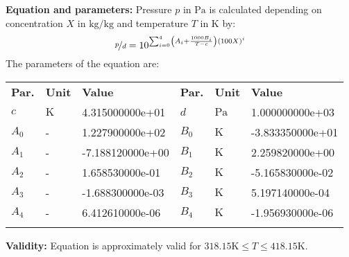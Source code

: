 \textbf{Equation and parameters:}
\newline
%
Pressure $p$ in $\si{\pascal}$ is calculated depending on concentration $X$ in $\si{\kilogram\per\kilogram}$ and  temperature $T$ in $\si{\kelvin}$ by:
%
\begin{equation*}
\nicefrac{p}{d} = 10 ^ { \sum_{i=0}^{4} \left( A_i + \frac{1000 B_i}{T - c} \right) \left( 100 X \right) ^{i}}
\end{equation*}
%
The parameters of the equation are:
%
\begin{longtable}[l]{lll|lll}
\toprule
\addlinespace
\textbf{Par.} & \textbf{Unit} & \textbf{Value} &	\textbf{Par.} & \textbf{Unit} & \textbf{Value} \\
\addlinespace
\midrule
\endhead

\bottomrule
\endfoot
\bottomrule
\endlastfoot
\addlinespace

$c$ & $\si{\kelvin}$ & 4.315000000e+01 & $d$ & $\si{\pascal}$ & 1.000000000e+03 \\
$A_0$ & - & 1.227900000e+02 & $B_0$ & $\si{\kelvin}$ & -3.833350000e+01 \\
$A_1$ & - & -7.188120000e+00 & $B_1$ & $\si{\kelvin}$ & 2.259820000e+00 \\
$A_2$ & - & 1.658530000e-01 & $B_2$ & $\si{\kelvin}$ & -5.165830000e-02 \\
$A_3$ & - & -1.688300000e-03 & $B_3$ & $\si{\kelvin}$ & 5.197140000e-04 \\
$A_4$ & - & 6.412610000e-06 & $B_4$ & $\si{\kelvin}$ & -1.956930000e-06 \\

\addlinespace\end{longtable}

\textbf{Validity:}
\newline
Equation is approximately valid for $318.15 \si{\kelvin} \leq T \leq 418.15 \si{\kelvin}$.
\newline

